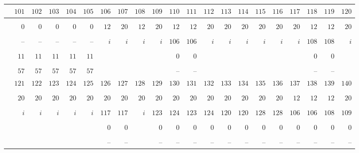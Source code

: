 \documentclass{amsart}
\theoremstyle{plain}
\theoremstyle{definition}
\theoremstyle{remark}
\begin{document}
{\begin{longtable}{rrrrrrrrrrrrrrrrrrrrr}
& $101$ & $102$ & $103$ & $104$ & $105$ & $106$ & $107$ & $108$ & $109$ & $110$ & $111$ & $112$ & $113$ & $114$ & $115$ & $116$ & $117$ & $118$ & $119$ & $120$\\\hline
\vspace*{-3mm}\\
& $0$ & $0$ & $0$ & $0$ & $0$ & $12$ & $20$ & $12$ & $20$ & $12$ & $12$ & $20$ & $20$ & $20$ & $20$ & $20$ & $20$ & $12$ & $12$ & $20$\\
\vspace*{-3mm}\\
& -- & -- & -- & -- & -- & $i$ & $i$ & $i$ & $i$ & $106$ & $106$ & $i$ & $i$ & $i$ & $i$ & $i$ & $i$ & $108$ & $108$ & $i$\\
\vspace*{-3mm}\\
& $11$ & $11$ & $11$ & $11$ & $11$ &  &  &  &  & $0$ & $0$ &  &  &  &  &  &  & $0$ & $0$ &  \\
\vspace*{-3mm}\\
& $57$ & $57$ & $57$ & $57$ & $57$ &  &  &  &  & -- & -- &  &  &  &  &  &  & -- & -- & 
\vspace*{5mm}\\
& $121$ & $122$ & $123$ & $124$ & $125$ & $126$ & $127$ & $128$ & $129$ & $130$ & $131$ & $132$ & $133$ & $134$ & $135$ & $136$ & $137$ & $138$ & $139$ & $140$\\\hline
\vspace*{-3mm}\\
& $20$ & $20$ & $20$ & $20$ & $20$ & $20$ & $20$ & $20$ & $20$ & $20$ & $20$ & $20$ & $20$ & $20$ & $20$ & $20$ & $12$ & $12$ & $12$ & $20$\\
\vspace*{-3mm}\\
& $i$ & $i$ & $i$ & $i$ & $i$ & $117$ & $117$ & $i$ & $123$ & $124$ & $123$ & $124$ & $120$ & $120$ & $128$ & $128$ & $106$ & $106$ & $108$ & $109$\\
\vspace*{-3mm}\\
&  &  &  &  &  & $0$ & $0$ &  & $0$ & $0$ & $0$ & $0$ & $0$ & $0$ & $0$ & $0$ & $0$ & $0$ & $0$ & $0$\\
\vspace*{-3mm}\\
&  &  &  &  &  & -- & -- &  & -- & -- & -- & -- & -- & -- & -- & -- & -- & -- & -- & --
\vspace*{5mm}\\

\end{longtable}}
\end{document}
